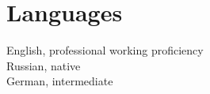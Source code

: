 \section{Languages}
English, professional working proficiency \\
Russian, native \\
German, intermediate 

